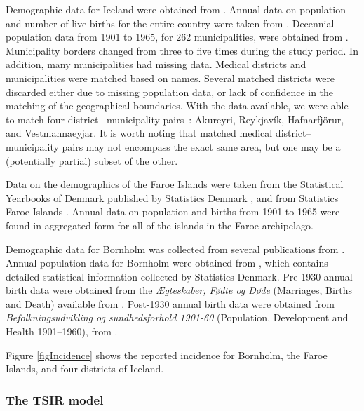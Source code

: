\documentclass[10pt]{article}
\begin{document}
Demographic data for Iceland were obtained from \cite{StatsIceland}. Annual data on population and number of live births for the entire country were taken from \cite{StatsIcelandBirths}. Decennial population data from 1901 to 1965, for 262 municipalities, were obtained from \cite{StatsIcelandPop}. Municipality borders changed from three to five times during the study period. In addition, many municipalities had missing data. Medical districts and municipalities were matched based on names. Several matched districts were discarded either due to missing population data, or lack of confidence in the matching of the geographical boundaries. With the data available, we were able to match four district-- municipality pairs~: Akureyri, Reykjav\'{i}k, Hafnarfj\"{o}r\dh{}ur, and Vestmannaeyjar. It is worth noting that matched medical district--municipality pairs may not encompass the exact same area, but one may be a (potentially partial) subset of the other. 

Data on the demographics of the Faroe Islands were taken from the Statistical Yearbooks of Denmark published by Statistics Denmark \cite{StatsDenmark}, and from Statistics Faroe Islands \cite{StatsFaroe}. Annual data on population and births from 1901 to 1965 were found in aggregated form for all of the islands in the Faroe archipelago. 

Demographic data for Bornholm was collected from several publications from \cite{StatsDenmark}. Annual population data for Bornholm were obtained from \cite{StatsDenmarkPop}, which contains detailed statistical information collected by Statistics Denmark. Pre-1930 annual birth data were obtained from the \textit{\AE{}gteskaber, F\o{}dte og D\o{}de} (Marriages, Births and Death) available from \cite{StatsDenmarkBirths1}. Post-1930 annual birth data were obtained from \textit{Befolkningsudvikling og sundhedsforhold 1901-60} (Population, Development and Health 1901--1960), from \cite{StatsDenmarkBirths2}.

Figure \ref{figIncidence} shows the reported incidence for Bornholm, the Faroe Islands, and four districts of Iceland.










\subsubsection*{The TSIR model}
\end{document}

